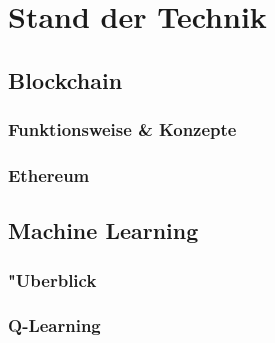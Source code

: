 \chapter{Stand der Technik}
\label{kap:Kapitel02}
%
       
%
\section{Blockchain}
\subsection{Funktionsweise \& Konzepte }
\subsection{Ethereum}

%
\section{Machine Learning}
\subsection{"Uberblick}
\subsection{Q-Learning}
%

%
